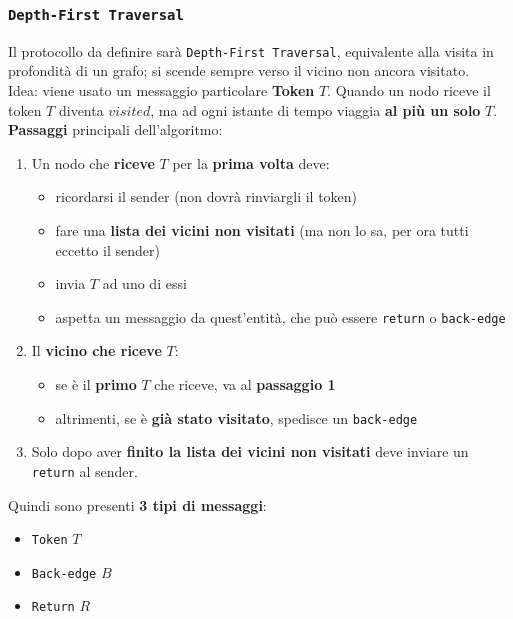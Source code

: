 \subsubsection{\texttt{Depth-First Traversal}}

Il protocollo da definire sarà \texttt{Depth-First Traversal}, equivalente alla visita in profondità di un grafo; si scende sempre verso il vicino non ancora visitato.\\

Idea: viene usato un messaggio particolare \textbf{Token} $T$. Quando un nodo riceve il token $T$ diventa $visited$, ma ad ogni istante di tempo viaggia \textbf{al più un solo} $T$.\\

\textbf{Passaggi} principali dell'algoritmo: 
\begin{enumerate}
	\item Un nodo che \textbf{riceve} $T$ per la \textbf{prima volta} deve: 
	\begin{itemize}
		\item ricordarsi il sender (non dovrà rinviargli il token)
		\item fare una \textbf{lista dei vicini non visitati} (ma non lo sa, per ora tutti eccetto il sender)
		\item invia $T$ ad uno di essi
		\item aspetta un messaggio da quest'entità, che può essere \texttt{return} o \texttt{back-edge}
	\end{itemize}
	\nn
	
	\item Il \textbf{vicino che riceve} $T$:
	\begin{itemize}
		\item se è il \textbf{primo} $T$ che riceve, va al \textbf{passaggio 1}
		\item altrimenti, se è \textbf{già stato visitato}, spedisce un \texttt{back-edge}
	\end{itemize}
	\nn
	
	\item Solo dopo aver \textbf{finito la lista dei vicini non visitati} deve inviare un \texttt{return} al sender.\\
\end{enumerate}

\newpage

Quindi sono presenti \textbf{3 tipi di messaggi}:
\begin{itemize}
	\item \texttt{Token} $T$
	\item \texttt{Back-edge} $B$
	\item \texttt{Return} $R$
\end{itemize} 

